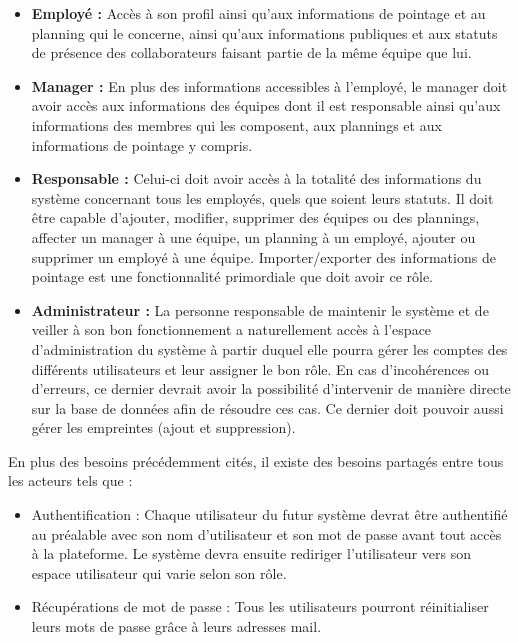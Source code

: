 \begin{itemize}
    \item [\textbullet] \textbf{Employé :} Accès à son profil ainsi qu’aux
        informations de pointage et au planning qui le concerne, ainsi qu’aux
        informations publiques et aux statuts de présence des collaborateurs
        faisant partie de la même équipe que lui.
        
    \item [\textbullet] \textbf{Manager :} En plus des informations accessibles
        à l’employé, le manager doit avoir accès aux informations des équipes
        dont il est responsable ainsi qu’aux informations des membres qui les
        composent, aux plannings et aux informations de pointage y compris.

    \item [\textbullet] \textbf{Responsable :} Celui-ci doit avoir accès à la
        totalité des informations du système concernant tous les employés, quels
        que soient leurs statuts. Il doit être capable d’ajouter, modifier,
        supprimer des équipes ou des plannings, affecter un manager à une
        équipe, un planning à un employé, ajouter ou supprimer un employé à
        une équipe. Importer/exporter des informations de pointage est une
        fonctionnalité primordiale que doit avoir ce rôle.
        
    \item [\textbullet] \textbf{Administrateur :} La personne responsable de
        maintenir le système et de veiller à son bon fonctionnement a
        naturellement accès à l’espace d’administration du système à partir
        duquel elle pourra gérer les comptes des différents utilisateurs et leur
        assigner le bon rôle. En cas d’incohérences ou d’erreurs, ce dernier
        devrait avoir la possibilité d’intervenir de manière directe sur la base
        de données afin de résoudre ces cas. Ce dernier doit pouvoir aussi gérer
        les empreintes (ajout et suppression).
\end{itemize}

En plus des besoins précédemment cités, il existe des besoins partagés entre
tous les acteurs tels que :

\begin{itemize}
    \item [\textbullet] Authentification : Chaque utilisateur du futur système
        devrat être authentifié au préalable avec son nom d’utilisateur et son
        mot de passe avant tout accès à la plateforme. Le système devra ensuite
        rediriger l’utilisateur vers son espace utilisateur qui varie selon son
        rôle.

    \item [\textbullet] Récupérations de mot de passe : Tous les utilisateurs
        pourront réinitialiser leurs mots de passe grâce à leurs adresses mail.
\end{itemize}
            
